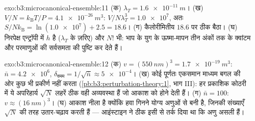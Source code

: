 \begin{solution}{exo:b3:microcanonical-ensemble:11}
(क) $\lambda_T = \qty{1.6e-11}{m}$। (ख) $V/N = k_{\text{B}}T/P =
\qty{4.1e-26}{m^3}$: $V/N\lambda_T^3 = \num{1.0e7}$, अतः
$S/Nk_{\text{B}} = \ln(\num{1.0e7}) + 2.5 = 18.6$। (ग) कैलोरीमितीय
$18.6$ पर ठीक बैठा। (घ) निरपेक्ष एन्ट्रॉपी में $h$ है
($\lambda_T$ के ज़रिए) और $N!$ भी: भाप के युग के ऊष्मा-मापन तीन
अंकों तक  के क्वांटम और
परमाणुओं की सर्वसमता की पुष्टि कर देते हैं।
\end{solution}

\begin{solution}{exo:b3:microcanonical-ensemble:12}
(क) $v = (\qty{550}{nm})^3 = \qty{1.7e-19}{m^3}$: $\bar n =
\num{4.2e6}$, $\delta_{\text{वमम}} = 1/\sqrt{\bar n} \approx
\num{5e-4}$। (ख) कोई पूर्णतः एकसमान माध्यम बगल की ओर कुछ भी प्रकीर्ण
नहीं करता (\cref{pb:b3:perturbation-theory:1}, भाग III): हर प्रकाशिक
कोठरी में ये अपरिहार्य $\sqrt N$ लहरें ठीक वही अव्यवस्था हैं
जो आकाश को होने देती हैं। (ग) $\bar n = 100$: $v
\approx (\qty{16}{nm})^3$। (घ) आकाश नीला है क्योंकि हवा गिनने योग्य
अणुओं से बनी है, जिनकी संख्याएँ $\sqrt N$ की तरह उतार-चढ़ाव करती हैं
--- आइंस्टाइन ने ठीक इसी से तर्क दिया था कि अणु असली हैं।
\end{solution}


